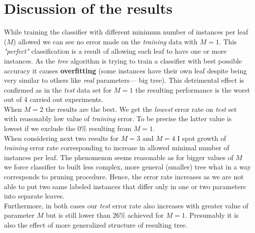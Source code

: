 \documentclass[12pt,a4paper,twocolumn]{article}
\begin{document}
\section*{Discussion of the results}
While training the classifier with different minimum number of instances per leaf ($M$) allowed we can see no error made on the \textit{training} data with $M=1$. This \textit{"perfect"} classification is a result of allowing each leaf to have one or more instances. As the \textit{tree} algorithm is trying to train a classifier with best possible accuracy it causes \textbf{overfitting} (some instances have their own leaf despite being very similar to others like \emph{real} parameters--- big tree). This detrimental effect is confirmed as in the \textit{test} data set for $M=1$ the resulting performance is the worst out of 4 carried out experiments.\\
When $M=2$ the results are the best. We get the \textit{lowest} error rate on \textit{test} set with reasonably low value of \textit{training} error. To be precise the latter value is lowest if we exclude the $0\%$ resulting from $M=1$.\\
When considering next two results for $M=3$ and $M=4$ I spot growth of \textit{training} error rate corresponding to increase in allowed minimal number of instances per leaf. The phenomenon seems reasonable as for bigger values of $M$ we force classifier to built less complex, more general (smaller) tree what in a way corresponds to pruning procedure. Hence, the error rate increases as we are not able to put two same labeled instances that differ only in one or two parameters into separate leaves.\\
Furthermore, in both cases our \textit{test} error rate also increases with greater value of parameter $M$ but is still lower than $26\%$ achieved for $M=1$. Presumably it is also the effect of more generalized structure of resulting tree.
\end{document}

